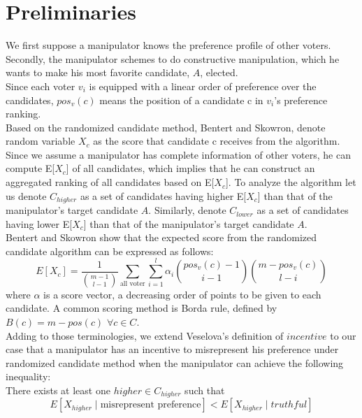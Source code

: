 \documentclass[letterpaper]{article} %
\begin{document}
\section{Preliminaries}
We first suppose a manipulator knows the preference profile of other voters. Secondly, the manipulator schemes to do constructive manipulation, which he wants to make his most favorite candidate, $A$, elected.\\
Since each voter $v_i$ is equipped with a linear order of preference over the candidates, $pos_v(c)$ means the position of a candidate c in $v_i$’s preference ranking.\\
Based on the randomized candidate method, Bentert and Skowron, denote random variable $X_c$ as the score that candidate c receives from the algorithm. Since we assume a manipulator has complete information of other voters, he can compute E[$X_c$] of all candidates, which implies that he can construct an aggregated ranking of all candidates based on E[$X_c$]. To analyze the algorithm let us denote $C_{higher}$ as a set of candidates having higher E[$X_c$] than that of the manipulator’s target candidate $A$. Similarly, denote $C_{lower}$  as a set of candidates having lower E[$X_c$] than that of the manipulator’s target candidate $A$.%
\\Bentert and Skowron show that the expected score from the randomized candidate algorithm can be expressed as follows: \\ 
\begin{equation} 
E[X_c] = \frac{1}{\binom{m-1}{l-1}}\sum_{\text{all voter}} \sum_{i=1}^l \alpha_i \binom{pos_v(c)-1}{i-1}\binom{m-pos_v(c)}{l-i} 
\end{equation}
where $\alpha$ is a score vector, a decreasing order of points to be given to each candidate. A common scoring method is Borda rule, defined by $B(c) = m - pos(c)$ $\forall c \in C$. \\
Adding to those terminologies, we extend Veselova's definition of $incentive$ to our case that a manipulator has an incentive to misrepresent his preference under randomized candidate method when the manipulator can achieve the following inequality: \\
There exists at least one $higher \in C_{higher}$ such that
\begin{equation}
E[X_{higher} \mid \text{misrepresent preference}] < E[X_{higher} \mid truthful]\nonumber
\end{equation}
\end{document}
